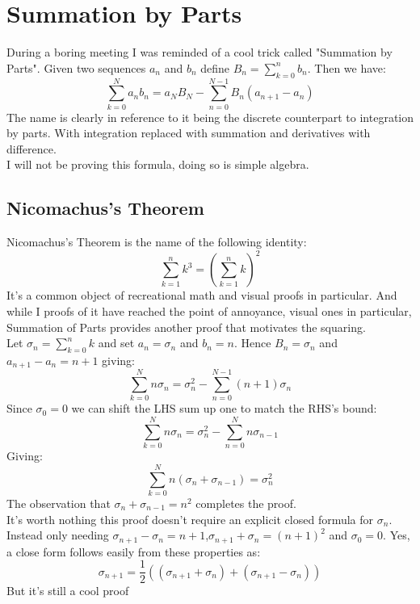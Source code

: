 
\section{Summation by Parts}
During a boring meeting I was reminded of a cool trick called "Summation by Parts".
Given two sequences $a_n$ and $b_n$ define $B_n = \sum_{k=0}^nb_n$.
Then we have:
\[\sum_{k=0}^Na_nb_n = a_NB_N-\sum_{n=0}^{N-1}B_n(a_{n+1}-a_n)\]
The name is clearly in reference to it being the discrete counterpart to integration by parts.
With integration replaced with summation and derivatives with difference.
\\

I will not be proving this formula, 
doing so is simple algebra.

\subsection{Nicomachus's Theorem}
Nicomachus's Theorem is the name of the following identity:
\[\sum_{k=1}^nk^3 = \left(\sum_{k=1}^nk\right)^2\]
It's a common object of recreational math and visual proofs in particular.
And while I proofs of it have reached the point of annoyance,
visual ones in particular,
Summation of Parts provides another proof that motivates the squaring.
\\

Let $\sigma_n = \sum_{k=0}^nk$ and set $a_n = \sigma_n$ and $b_n=n$.
Hence $B_n = \sigma_n$ and $a_{n+1}-a_n = n+1$ giving:
\[\sum_{k=0}^Nn\sigma_n = \sigma_n^2-\sum_{n=0}^{N-1}(n+1)\sigma_n\]
Since $\sigma_0=0$ we can shift the LHS sum up one to match the RHS's bound:
\[\sum_{k=0}^Nn\sigma_n = \sigma_n^2-\sum_{n=0}^{N}n\sigma_{n-1}\]
Giving:
\[\sum_{k=0}^Nn(\sigma_n+\sigma_{n-1}) = \sigma_n^2\]
The observation that $\sigma_n+\sigma_{n-1}=n^2$ completes the proof.
\\

It's worth nothing this proof doesn't require an explicit closed formula for $\sigma_n$.
Instead only needing $\sigma_{n+1}-\sigma_n = n+1$,$\sigma_{n+1}+\sigma_n =(n+1)^2$ and $\sigma_0 = 0$.
Yes, a close form follows easily from these properties as:
\[\sigma_{n+1} = \frac{1}{2}((\sigma_{n+1}+\sigma_n)+(\sigma_{n+1}-\sigma_n))\]
But it's still a cool proof

